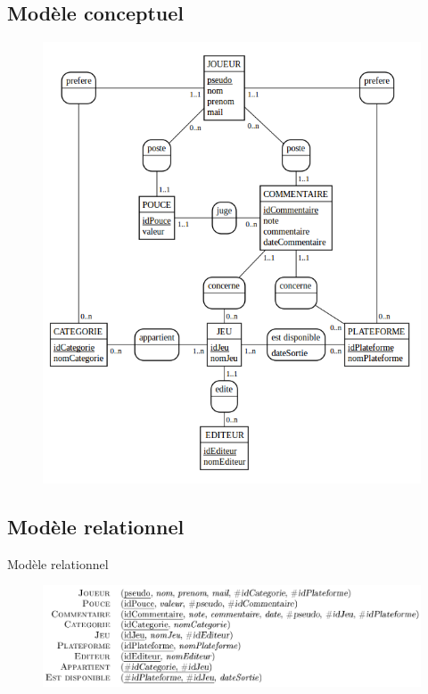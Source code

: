 \documentclass{beamer}
\begin{document}
\subsection{Modèle conceptuel}
\begin{frame}
\begin{center}
\begin{figure}[t]
  \includegraphics[scale=0.36]{modele_conceptuel.png}
\end{figure}
\end{center}
\end{frame}

\subsection{Modèle relationnel}
\begin{frame}
\begin{block}{Modèle relationnel}
\begin{center}
\begin{figure}[t]
  \includegraphics[scale=0.3]{modeleR.png}
\end{figure}
\end{center}
\end{block}
\end{frame}
\end{document}
